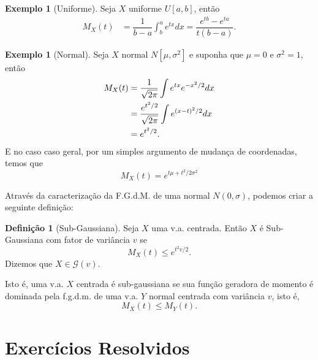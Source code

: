 \documentclass[12pt,a4paper,oneside]{book}
\theoremstyle{definition}
\newtheorem{definition}[theorem]{Defini\c{c}\~ao}
\newtheorem{example}[theorem]{Exemplo}
\theoremstyle{remark}
\numberwithin{equation}{section}
\begin{document}
\begin{example}[Uniforme] Seja $X$ uniforme $U[a,b]$, então
\begin{align*}
M_X(t)  &= \dfrac{1}{b-a}\int_b^a e^{tx} dx =  \dfrac{e^{tb}-e^{ta}}{t(b-a)}.
\end{align*}
\end{example}


\begin{example}[Normal] Seja $X$ normal $N[\mu,\sigma^2]$ e suponha que $\mu=0$ e $\sigma^2=1$, então
\begin{align*}
M_X(t)  &= \dfrac{1}{\sqrt{2\pi}}\int e^{tx} e^{-x^2 / 2} dx \\
	&= \dfrac{e^{t^2 / 2}}{\sqrt{2\pi}}  \int  e^{\-(x-t)^2/2} dx \\
	&= e^{t^2/2}.
\end{align*}
E no caso caso geral, por um simples argumento de mudança de coordenadas, temos que
$$M_X(t) = e^{t\mu + t^2/2\sigma^2}$$
\end{example}



\begin{tcolorbox}
Através da caracterização da F.G.d.M. de uma normal $N(0,\sigma)$, podemos criar a seguinte definição:

\begin{definition}[Sub-Gaussiana]\label{Subgauss}
Seja $X$ uma v.a. centrada. Então $X$ é Sub-Gaussiana com fator de variância $v$ se 
$$M_X(t)\leq e^{ t^2 v/2}. $$
Dizemos que $X\in \mathcal{G}(v).$
\end{definition} 
Isto é, uma  v.a. $X$ centrada é sub-gaussiana se sua função geradora de momento é dominada pela f.g.d.m. de uma v.a. $Y$ normal centrada com variância $v$, isto é, 
$$M_X(t)\leq M_Y(t) .$$ 
\end{tcolorbox}



\newpage
\section{Exercícios Resolvidos}
\end{document}
